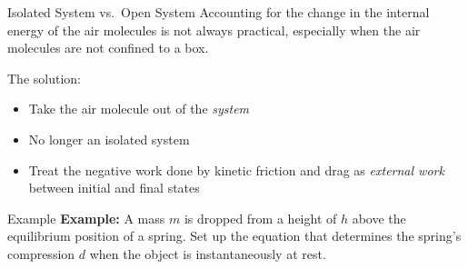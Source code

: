 \documentclass[12pt,compress,aspectratio=169]{beamer}
\begin{document}
\begin{frame}{Isolated System vs.\ Open System}
  Accounting for the change in the internal energy of the air molecules is not
  always practical, especially when the air molecules are not confined to a box.
  \begin{center}
  \end{center}
  The solution:
  \begin{itemize}
  \item Take the air molecule out of the \emph{system}
  \item No longer an isolated system
  \item Treat the negative work done by kinetic friction and drag as
    \emph{external work} between initial and final states

  \end{itemize}
\end{frame}

%
%  
%    



\begin{frame}{Example}
  \textbf{Example:} A mass $m$ is dropped from a height of $h$ above the
  equilibrium position of a spring. Set up the equation that determines the
  spring's compression $d$ when the object is instantaneously at rest.
  \begin{center}
  \end{center}
\end{frame}
\end{document}

